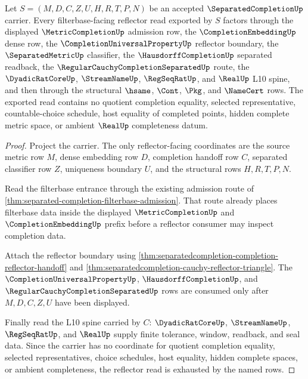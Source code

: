 \begin{theorem}
\label{thm:separated-completion-filterbase-reflector-exhaustion}
Let $S=(M,D,C,Z,U,H,R,T,P,N)$ be an accepted $\SeparatedCompletionUp$ carrier. Every filterbase-facing reflector read exported by $S$ factors through the displayed $\MetricCompletionUp$ admission row, the $\CompletionEmbeddingUp$ dense row, the $\CompletionUniversalPropertyUp$ reflector boundary, the $\SeparatedMetricUp$ classifier, the $\HausdorffCompletionUp$ separated readback, the $\RegularCauchyCompletionSeparatedUp$ route, the $\DyadicRatCoreUp$, $\StreamNameUp$, $\RegSeqRatUp$, and $\RealUp$ L10 spine, and then through the structural $\hsame$, $\Cont$, $\Pkg$, and $\NameCert$ rows. The exported read contains no quotient completion equality, selected representative, countable-choice schedule, host equality of completed points, hidden complete metric space, or ambient $\RealUp$ completeness datum.
\end{theorem}
\begin{proof}
Project the carrier. The only reflector-facing coordinates are the source metric row $M$, dense embedding row $D$, completion handoff row $C$, separated classifier row $Z$, uniqueness boundary $U$, and the structural rows $H,R,T,P,N$.

Read the filterbase entrance through the existing admission route of \autoref{thm:separated-completion-filterbase-admission}. That route already places filterbase data inside the displayed $\MetricCompletionUp$ and $\CompletionEmbeddingUp$ prefix before a reflector consumer may inspect completion data.

Attach the reflector boundary using \autoref{thm:separatedcompletion-completion-reflector-handoff} and \autoref{thm:separatedcompletion-cauchy-reflector-triangle}. The $\CompletionUniversalPropertyUp$, $\HausdorffCompletionUp$, and $\RegularCauchyCompletionSeparatedUp$ rows are consumed only after $M,D,C,Z,U$ have been displayed.

Finally read the L10 spine carried by $C$: $\DyadicRatCoreUp$, $\StreamNameUp$, $\RegSeqRatUp$, and $\RealUp$ supply finite tolerance, window, readback, and seal data. Since the carrier has no coordinate for quotient completion equality, selected representatives, choice schedules, host equality, hidden complete spaces, or ambient completeness, the reflector read is exhausted by the named rows.
\end{proof}

